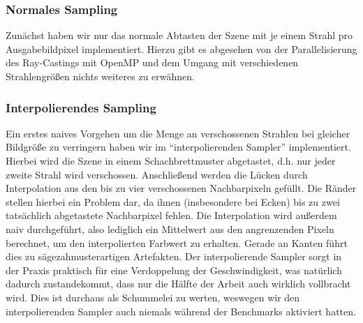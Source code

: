 \subsubsection{Normales Sampling}
Zunächst haben wir nur das normale Abtasten der Szene mit je einem Strahl pro Ausgabebildpixel implementiert.
Hierzu gibt es abgesehen von der Parallelisierung des Ray-Castings mit OpenMP und dem Umgang mit verschiedenen Strahlengrößen nichts weiteres zu erwähnen.

\subsubsection{Interpolierendes Sampling}
Ein erstes naives Vorgehen um die Menge an verschossenen Strahlen bei gleicher Bildgröße zu verringern haben wir im "`interpolierenden Sampler"' implementiert.
Hierbei wird die Szene in einem Schachbrettmuster abgetastet, d.h. nur jeder zweite Strahl wird verschossen.
Anschließend werden die Lücken durch Interpolation aus den bis zu vier verschossenen Nachbarpixeln gefüllt.
Die Ränder stellen hierbei ein Problem dar, da ihnen (insbesondere bei Ecken) bis zu zwei tatsächlich abgetastete Nachbarpixel fehlen.
Die Interpolation wird außerdem naiv durchgeführt, also lediglich ein Mittelwert aus den angrenzenden Pixeln berechnet, um den interpolierten Farbwert zu erhalten.
Gerade an Kanten führt dies zu sägezahmusterartigen Artefakten.
Der interpolierende Sampler sorgt in der Praxis praktisch für eine Verdoppelung der Geschwindigkeit, was natürlich dadurch zustandekommt, dass nur die Hälfte der Arbeit auch wirklich vollbracht wird.
Dies ist durchaus als Schummelei zu werten, weswegen wir den interpolierenden Sampler auch niemals während der Benchmarks aktiviert hatten.

